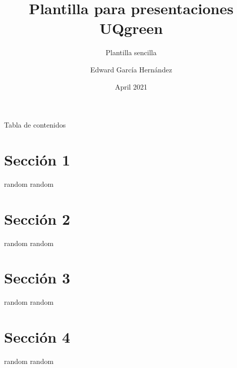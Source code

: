 \documentclass{beamer}
\title{Plantilla para presentaciones UQgreen}
\subtitle{Plantilla sencilla}
\author{Edward García Hernández}
\institute{Universidad del Quindío}
\date{April 2021}
\begin{document}
\begin{frame}{Tabla de contenidos}
    \tableofcontents
\end{frame}

\section{Sección 1}

\begin{frame}{random}
    random
\end{frame}

\section{Sección 2}

\begin{frame}{random}
    random
\end{frame}

\section{Sección 3}

\begin{frame}{random}
    random
\end{frame}

\section{Sección 4}

\begin{frame}{random}
    random
\end{frame}
\end{document}
